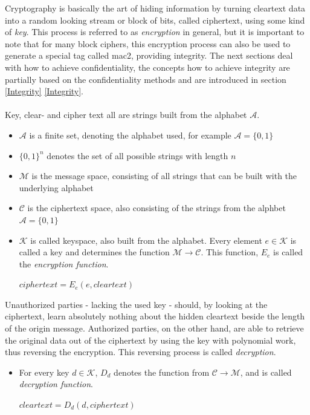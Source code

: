 Cryptography is basically the art of hiding information by turning cleartext
data into a random looking stream or block of bits, called ciphertext, using some kind of
\textit{key}. This process is referred to as \textit{encryption} in general, but it is important to note that for many block ciphers, this encryption process
can also be used to generate a special tag called \gls{mac2}, providing integrity. The next sections deal with how to achieve confidentiality, the 
concepts how to achieve integrity are partially based on the confidentiality methods and are introduced in section \ref{Integrity}
\ref{Integrity}. 
\\
\\
Key, clear- and cipher text all are strings built from the alphabet $\mathcal{A}$. 

\begin{itemize}
 \item $\mathcal{A}$ is a finite set, denoting the alphabet used, for example
 $\mathcal{A} = \{0, 1\}$
 \item $\{0, 1\}^n$ denotes the set of all possible strings with length $n$
 \item $\mathcal{M}$ is the message space, consisting of all strings that can be built with the 
 underlying alphabet
 \item $\mathcal{C}$ is the ciphertext space, also consisting of the strings from 
 the alphbet
$\mathcal{A} = \{0, 1\}$

\item $\mathcal{K}$ is called keyspace, also built from the alphabet. Every element
 $e \in \mathcal{K}$ is called a key and determines the function $\mathcal{M} \rightarrow \mathcal{C}$.
 This function, $E_e$ is called the \textit{encryption function}. 
  \begin{center}
 $ciphertext = E_e(e, cleartext)$
  \end{center}
\end{itemize}

Unauthorized parties - lacking the used key - should, by looking at the ciphertext, learn
absolutely nothing about the hidden cleartext beside the length of the origin message. Authorized parties, on the other hand, are
able to retrieve the original data out of the ciphertext by using the key with polynomial work, thus reversing
the encryption. This reversing process is called \textit{decryption}.

\begin{itemize}

 \item For every key $d \in \mathcal{K}$, $D_d$ denotes the function from $\mathcal{C} \rightarrow
  \mathcal{M}$, and is called \textit{decryption function}.
  \begin{center}
  $cleartext  = D_d(d, ciphertext)$
    \end{center}
\end{itemize}

